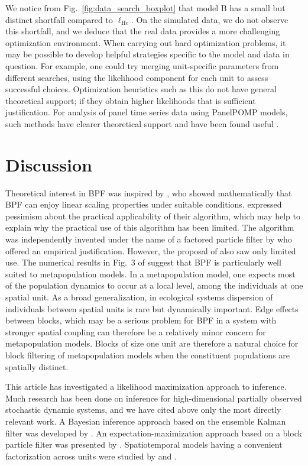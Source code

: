 \documentclass[12pt]{article}\usepackage[]{graphicx}\usepackage[]{xcolor}
\begin{document}
We notice from Fig.~\ref{fig:data_search_boxplot} that model B has a small but distinct shortfall compared to $\ell_{\mathrm He}$.
On the simulated data, we do not observe this shortfall, and we deduce that the real data provides a more challenging optimization environment.
When carrying out hard optimization problems, it may be possible to develop helpful strategies specific to the model and data in question.
For example, one could try merging unit-specific parameters from different searches, using the likelihood component for each unit to assess successful choices.
Optimization heuristics such as this do not have general theoretical support; if they obtain higher likelihoods that is sufficient justification. 
For analysis of panel time series data using PanelPOMP models, such methods have clearer theoretical support and have been found useful \citep{breto19}.

\section{Discussion}
\label{sec:discussion}

Theoretical interest in BPF was inspired by \citet{rebeschini15}, who showed mathematically that BPF can enjoy linear scaling properties under suitable conditions.
\citet{rebeschini15} expressed pessimism about the practical applicability of their algorithm, which may help to explain why the practical use of this algorithm has been limited.
The algorithm was independently invented under the name of a factored particle filter by \citet{ng02} who offered an empirical justification.
However, the proposal of \citet{ng02} also saw only limited use.
The numerical results in Fig.~3 of \citet{ionides21} suggest that BPF is particularly well suited to metapopulation models.
In a metapopulation model, one expects most of the population dynamics to occur at a local level, among the individuals at one spatial unit.
As a broad generalization, in ecological systems dispersion of individuals between spatial units is rare but dynamically important.
Edge effects between blocks, which may be a serious problem for BPF in a system with stronger spatial coupling \citep{ionides21} can therefore be a relatively minor concern for metapopulation models.
Blocks of size one unit are therefore a natural choice for block filtering of metapopulation models when the constituent populations are spatially distinct.

This article has investigated a likelihood maximization approach to inference.
Much research has been done on inference for high-dimensional partially observed stochastic dynamic systems, and we have cited above only the most directly relevant work.
A Bayesian inference approach based on the ensemble Kalman filter was developed by \citet{katzfuss19}.
An expectation-maximization approach based on a block particle filter was presented by \citet{finke17}.
Spatiotemporal models having a convenient factorization across units were studied by \citet{beskos17} and \citet{xu19}.
\end{document}
